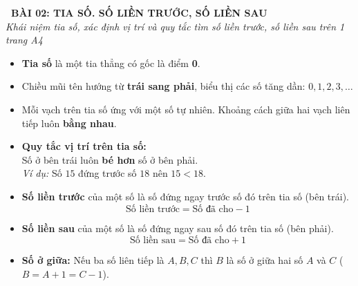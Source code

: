 \documentclass[11pt,a4paper]{article}
\begin{document}
\begin{tcolorbox}[
  enhanced,
  colback=violet!8!white,
  colframe=violet!70!black,
  arc=3mm, boxrule=1.2pt,
  left=3mm, right=3mm, top=2mm, bottom=2mm,
  halign=center
]
  {\LARGE\bfseries\color{violet!90!black}\faBookmark\ BÀI 02: TIA SỐ. SỐ LIỀN TRƯỚC, SỐ LIỀN SAU}\\[1mm]
  {\itshape\footnotesize\color{black!75} Khái niệm tia số, xác định vị trí và quy tắc tìm số liền trước, số liền sau trên 1 trang A4}
\end{tcolorbox}

\vspace{-2mm}

\noindent
\begin{minipage}[t]{0.49\textwidth}\vspace{0pt}
\begin{tcolorbox}[
  enhanced,
  colback=violet!4!white,
  colframe=violet!75!black,
  arc=2mm, boxrule=0.8pt,
  left=2mm, right=2mm, top=1.8mm, bottom=1.8mm,
  title={\footnotesize\bfseries\color{white}\faKey\ 1. Khái niệm tia số}
]
{\footnotesize
\begin{itemize}\setlength{\itemsep}{1pt}\setlength{\leftskip}{-2.5mm}
  \item \textbf{Tia số} là một tia thẳng có gốc là điểm \textbf{0}.
  \item Chiều mũi tên hướng từ \textbf{trái sang phải}, biểu thị các số tăng dần: $0, 1, 2, 3, \dots$
  \item Mỗi vạch trên tia số ứng với một số tự nhiên. Khoảng cách giữa hai vạch liên tiếp luôn \textbf{bằng nhau}.
  \item \textbf{Quy tắc vị trí trên tia số:}\\
  Số ở bên trái luôn \textbf{bé hơn} số ở bên phải.\\
  \textit{Ví dụ:} Số $15$ đứng trước số $18$ nên $15 < 18$.
\end{itemize}
}
\end{tcolorbox}
\end{minipage}
\hfill
\begin{minipage}[t]{0.49\textwidth}\vspace{0pt}
\begin{tcolorbox}[
  enhanced,
  colback=teal!4!white,
  colframe=teal!75!black,
  arc=2mm, boxrule=0.8pt,
  left=2mm, right=2mm, top=1.8mm, bottom=1.8mm,
  title={\footnotesize\bfseries\color{white}\faSliders\ 2. Số liền trước, số liền sau}
]
{\footnotesize
\begin{itemize}\setlength{\itemsep}{1pt}\setlength{\leftskip}{-2.5mm}
  \item \textbf{Số liền trước} của một số là số đứng ngay trước số đó trên tia số (bên trái).
  $$\text{Số liền trước} = \text{Số đã cho} - 1$$
  \item \textbf{Số liền sau} của một số là số đứng ngay sau số đó trên tia số (bên phải).
  $$\text{Số liền sau} = \text{Số đã cho} + 1$$
  \item \textbf{Số ở giữa:} Nếu ba số liên tiếp là $A, B, C$ thì $B$ là số ở giữa hai số $A$ và $C$ ($B = A + 1 = C - 1$).
\end{itemize}
}
\end{tcolorbox}
\end{minipage}
\end{document}

